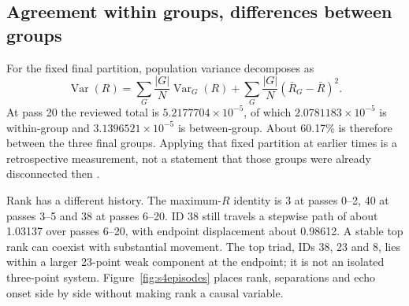 \documentclass[11pt,a4paper]{article}
\begin{document}
\subsection{Agreement within groups, differences between groups}
For the fixed final partition, population variance decomposes as
\begin{equation}
\operatorname{Var}(R)=\sum_G\frac{|G|}{N}\operatorname{Var}_G(R)
 +\sum_G\frac{|G|}{N}(\bar R_G-\bar R)^2.\label{eq:vardec}
\end{equation}
At pass 20 the reviewed total is $5.2177704\times10^{-5}$, of which $2.0781183\times10^{-5}$ is within-group and $3.1396521\times10^{-5}$ is between-group. About 60.17\% is therefore between the three final groups. Applying that fixed partition at earlier times is a retrospective measurement, not a statement that those groups were already disconnected then \cite{review4}.

Rank has a different history. The maximum-$R$ identity is 3 at passes 0--2, 40 at passes 3--5 and 38 at passes 6--20. ID 38 still travels a stepwise path of about 1.03137 over passes 6--20, with endpoint displacement about 0.98612. A stable top rank can coexist with substantial movement. The top triad, IDs 38, 23 and 8, lies within a larger 23-point weak component at the endpoint; it is not an isolated three-point system. Figure~\ref{fig:s4episodes} places rank, separations and echo onset side by side without making rank a causal variable.
\end{document}
